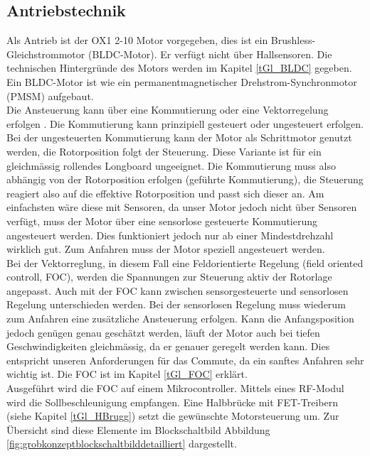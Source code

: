 \subsection*{Antriebstechnik}
Als Antrieb ist der OX1 2-10 Motor vorgegeben, dies ist ein Brushless-Gleichstrommotor (BLDC-Motor). Er verfügt nicht über Hallsensoren. Die technischen Hintergründe des Motors werden im Kapitel \ref{tGl_BLDC} gegeben. Ein BLDC-Motor ist wie ein permanentmagnetischer Drehstrom-Synchronmotor (PMSM) aufgebaut.\\
Die Ansteuerung kann über eine Kommutierung oder eine Vektorregelung erfolgen\cite{BLDC} . Die Kommutierung kann prinzipiell gesteuert oder ungesteuert erfolgen. Bei der ungesteuerten Kommutierung kann der Motor als Schrittmotor genutzt werden, die Rotorposition folgt der Steuerung. Diese Variante ist für ein gleichmässig rollendes Longboard ungeeignet. Die Kommutierung muss also abhängig von der Rotorposition erfolgen (geführte Kommutierung), die Steuerung reagiert also auf die effektive Rotorposition und passt sich dieser an. Am einfachsten wäre diese mit Sensoren, da unser Motor jedoch nicht über Sensoren verfügt, muss der Motor über eine sensorlose gesteuerte Kommutierung angesteuert werden. Dies funktioniert jedoch nur ab einer Mindestdrehzahl wirklich gut. Zum Anfahren muss der Motor speziell angesteuert werden. \\
Bei der Vektorreglung, in diesem Fall eine Feldorientierte Regelung (field oriented controll, FOC), werden die Spannungen zur Steuerung aktiv der Rotorlage angepasst. Auch mit der FOC kann zwischen sensorgesteuerte und sensorlosen Regelung unterschieden werden. Bei der sensorlosen Regelung muss wiederum zum Anfahren eine zusätzliche Ansteuerung erfolgen.  Kann die Anfangsposition jedoch genügen genau geschätzt werden, läuft der Motor auch bei tiefen Geschwindigkeiten gleichmässig, da er genauer geregelt werden kann. Dies entspricht unseren Anforderungen für das Commute, da ein sanftes Anfahren sehr wichtig ist. Die FOC ist im Kapitel \ref{tGl_FOC} erklärt.\\
Ausgeführt wird die FOC auf einem Mikrocontroller. Mittels eines RF-Modul wird die Sollbeschleunigung empfangen. Eine Halbbrücke mit FET-Treibern (siehe Kapitel \ref{tGl_HBrugg}) setzt  die gewünschte Motorsteuerung um. Zur Übersicht sind diese Elemente im Blockschaltbild Abbildung \ref{fig:grobkonzeptblockschaltbilddetailliert} dargestellt. 


